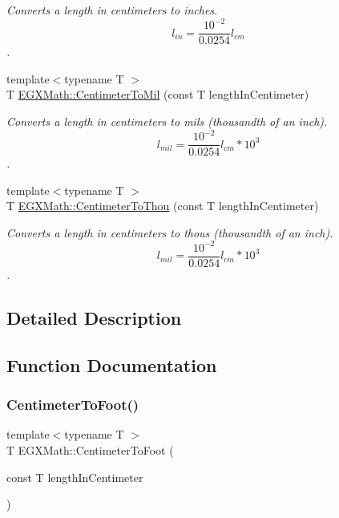 \begin{DoxyCompactItemize}
\begin{DoxyCompactList}\small\item\em Converts a length in centimeters to inches. \[ l_{in}= \frac{10^{-2}}{0.0254} l_{cm} \]. \end{DoxyCompactList}\item 
{\footnotesize template$<$typename T $>$ }\\T \mbox{\hyperlink{group___e_g_x_math-_conversions-_length_conversions-_centimeter-_imperial_ga4d32adb63d2c5ac44ce1f7a0ba746452}{E\+G\+X\+Math\+::\+Centimeter\+To\+Mil}} (const T length\+In\+Centimeter)
\begin{DoxyCompactList}\small\item\em Converts a length in centimeters to mils (thousandth of an inch). \[ l_{mil}= \frac{10^{-2}}{0.0254} l_{cm} * 10^{3} \]. \end{DoxyCompactList}\item 
{\footnotesize template$<$typename T $>$ }\\T \mbox{\hyperlink{group___e_g_x_math-_conversions-_length_conversions-_centimeter-_imperial_ga06aee91cfbc90db20c6a085129dbf4fa}{E\+G\+X\+Math\+::\+Centimeter\+To\+Thou}} (const T length\+In\+Centimeter)
\begin{DoxyCompactList}\small\item\em Converts a length in centimeters to thous (thousandth of an inch). \[ l_{mil}= \frac{10^{-2}}{0.0254} l_{cm} * 10^{3} \]. \end{DoxyCompactList}\end{DoxyCompactItemize}


\subsection{Detailed Description}


\subsection{Function Documentation}
\mbox{\label{group___e_g_x_math-_conversions-_length_conversions-_centimeter-_imperial_ga27bbb3b1cf61bac428f40d6804e9aaec}} 
\subsubsection{\texorpdfstring{Centimeter\+To\+Foot()}{CentimeterToFoot()}}
{\footnotesize\ttfamily template$<$typename T $>$ \\
T E\+G\+X\+Math\+::\+Centimeter\+To\+Foot (\begin{DoxyParamCaption}\item[{const T}]{length\+In\+Centimeter }\end{DoxyParamCaption})}



